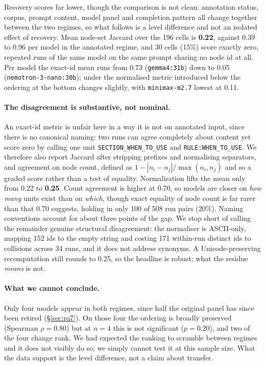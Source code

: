 \documentclass{article}
\begin{document}
Recovery scores far lower, though the comparison is not clean: annotation status, corpus, prompt content, model panel and completion pattern all change together between the two regimes, so what follows is a level difference and not an isolated effect of recovery. Mean node-set Jaccard over the 196 cells is \textbf{0.22}, against 0.39 to 0.96 per model in the annotated regime, and 30 cells (15\%) score exactly zero, repeated runs of the same model on the same prompt sharing no node id at all. Per model the exact-id mean runs from 0.73 (\texttt{gemma4:31b}) down to 0.05 (\texttt{nemotron-3-nano:30b}); under the normalised metric introduced below the ordering at the bottom changes slightly, with \texttt{minimax-m2.7} lowest at 0.11.

\paragraph{The disagreement is substantive, not nominal.}
An exact-id metric is unfair here in a way it is not on annotated input, since there is no canonical naming: two runs can agree completely about content yet score zero by calling one unit \texttt{SECTION\_WHEN\_TO\_USE} and \texttt{RULE:WHEN\_TO\_USE}. We therefore also report Jaccard after stripping prefixes and normalising separators, and agreement on node count, defined as $1 - |n_i - n_j| / \max(n_i, n_j)$ and so a graded score rather than a test of equality. Normalisation lifts the mean only from 0.22 to \textbf{0.25}. Count agreement is higher at 0.70, so models are closer on \emph{how many} units exist than on \emph{which}, though exact equality of node count is far rarer than that 0.70 suggests, holding in only 100 of 508 run pairs (20\%). Naming conventions account for about three points of the gap. We stop short of calling the remainder genuine structural disagreement: the normaliser is ASCII-only, mapping 152 ids to the empty string and costing 171 within-run distinct ids to collisions across 34 runs, and it does not address synonyms. A Unicode-preserving recomputation still rounds to 0.25, so the headline is robust; what the residue \emph{means} is not.

\paragraph{What we cannot conclude.}
Only four models appear in both regimes, since half the original panel has since been retired (\S\ref{sec:rq7}). On those four the ordering is broadly preserved (Spearman $\rho=0.80$) but at $n=4$ this is not significant ($p=0.20$), and two of the four change rank. We had expected the ranking to scramble between regimes and it does not visibly do so; we simply cannot test it at this sample size. What the data support is the level difference, not a claim about transfer.
\end{document}

